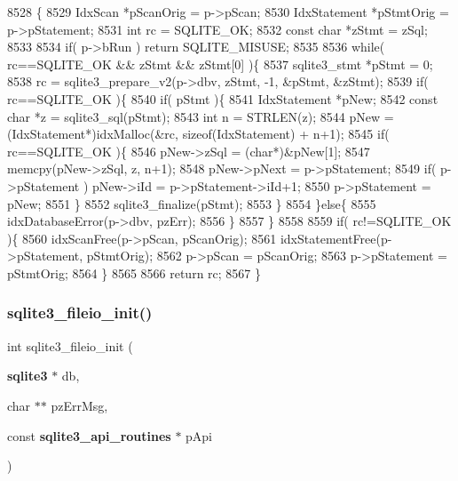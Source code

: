 \begin{DoxyCode}
8528  \{
8529   IdxScan *pScanOrig = p->pScan;
8530   IdxStatement *pStmtOrig = p->pStatement;
8531   \textcolor{keywordtype}{int} rc = SQLITE_OK;
8532   \textcolor{keyword}{const} \textcolor{keywordtype}{char} *zStmt = zSql;
8533 
8534   \textcolor{keywordflow}{if}( p->bRun ) \textcolor{keywordflow}{return} SQLITE_MISUSE;
8535 
8536   \textcolor{keywordflow}{while}( rc==SQLITE_OK && zStmt && zStmt[0] )\{
8537     sqlite3_stmt *pStmt = 0;
8538     rc = sqlite3_prepare_v2(p->dbv, zStmt, -1, &pStmt, &zStmt);
8539     \textcolor{keywordflow}{if}( rc==SQLITE_OK )\{
8540       \textcolor{keywordflow}{if}( pStmt )\{
8541         IdxStatement *pNew;
8542         \textcolor{keyword}{const} \textcolor{keywordtype}{char} *z = sqlite3_sql(pStmt);
8543         \textcolor{keywordtype}{int} n = STRLEN(z);
8544         pNew = (IdxStatement*)idxMalloc(&rc, \textcolor{keyword}{sizeof}(IdxStatement) + n+1);
8545         \textcolor{keywordflow}{if}( rc==SQLITE_OK )\{
8546           pNew->zSql = (\textcolor{keywordtype}{char}*)&pNew[1];
8547           memcpy(pNew->zSql, z, n+1);
8548           pNew->pNext = p->pStatement;
8549           \textcolor{keywordflow}{if}( p->pStatement ) pNew->iId = p->pStatement->iId+1;
8550           p->pStatement = pNew;
8551         \}
8552         sqlite3_finalize(pStmt);
8553       \}
8554     \}\textcolor{keywordflow}{else}\{
8555       idxDatabaseError(p->dbv, pzErr);
8556     \}
8557   \}
8558 
8559   \textcolor{keywordflow}{if}( rc!=SQLITE_OK )\{
8560     idxScanFree(p->pScan, pScanOrig);
8561     idxStatementFree(p->pStatement, pStmtOrig);
8562     p->pScan = pScanOrig;
8563     p->pStatement = pStmtOrig;
8564   \}
8565 
8566   \textcolor{keywordflow}{return} rc;
8567 \}
\end{DoxyCode}
\mbox{\label{shell_8c_a796bd781716c0cd114f460c66ee39e1d}} 
\subsubsection{sqlite3\+\_\+fileio\+\_\+init()}
{\footnotesize\ttfamily int sqlite3\+\_\+fileio\+\_\+init (\begin{DoxyParamCaption}\item[{\textbf{ sqlite3} $\ast$}]{db,  }\item[{char $\ast$$\ast$}]{pz\+Err\+Msg,  }\item[{const \textbf{ sqlite3\+\_\+api\+\_\+routines} $\ast$}]{p\+Api }\end{DoxyParamCaption})}



